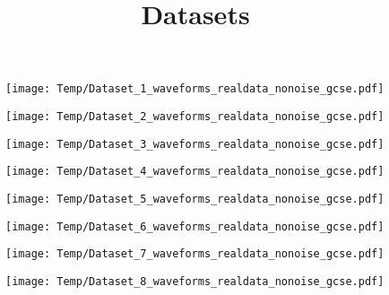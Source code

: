 \documentclass[14pt,a4paper]{extarticle}
\title{Datasets}
\author{}
\date{}
\begin{document}
\begin{figure}
\centering
\texttt{[image: Temp/Dataset\_1\_waveforms\_realdata\_nonoise\_gcse.pdf]}
\end{figure}

\begin{figure}
\centering
\texttt{[image: Temp/Dataset\_2\_waveforms\_realdata\_nonoise\_gcse.pdf]}
\end{figure}

\begin{figure}
\centering
\texttt{[image: Temp/Dataset\_3\_waveforms\_realdata\_nonoise\_gcse.pdf]}
\end{figure}

\begin{figure}
\centering
\texttt{[image: Temp/Dataset\_4\_waveforms\_realdata\_nonoise\_gcse.pdf]}
\end{figure}

\begin{figure}
\centering
\texttt{[image: Temp/Dataset\_5\_waveforms\_realdata\_nonoise\_gcse.pdf]}
\end{figure}

\begin{figure}
\centering
\texttt{[image: Temp/Dataset\_6\_waveforms\_realdata\_nonoise\_gcse.pdf]}
\end{figure}

\begin{figure}
\centering
\texttt{[image: Temp/Dataset\_7\_waveforms\_realdata\_nonoise\_gcse.pdf]}
\end{figure}

\begin{figure}
\centering
\texttt{[image: Temp/Dataset\_8\_waveforms\_realdata\_nonoise\_gcse.pdf]}
\end{figure}
\end{document}
